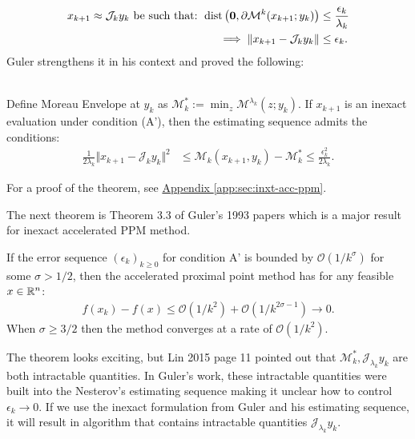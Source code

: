 \documentclass[12pt]{article}
\begin{document}
    \begin{align*}
        x_{k + 1}\approx \mathcal J_{k} y_k \text{ be such that: }
        \operatorname{dist}\left(
            \mathbf 0, \partial \mathcal M^{k}(x_{k + 1}; y_k)
        \right) &\le \frac{\epsilon_k}{\lambda_k}
        \\
        \implies 
        \Vert x_{k + 1} - \mathcal J_{k}y_k\Vert 
        &\le \epsilon_k. 
    \end{align*}
    Guler strengthens it in his context and proved the following: 
    \begin{theorem}\label{thm:guler-inexact-ppm-bound}
        \;\\
        Define Moreau Envelope at $y_k$ as $\mathcal M_k^* := \min_z \mathcal {M}^{\lambda_k}(z; y_k)$. 
        If $x_{k +1}$ is an inexact evaluation under condition (A'), then the estimating sequence admits the conditions: 
        \begin{align*}
            \frac{1}{2\lambda_k} \Vert x_{k + 1} - \mathcal J_k y_k\Vert^2
            &\le 
            \mathcal M_k(x_{k + 1}, y_k) - \mathcal M^*_k
            \le \frac{\epsilon_k^2}{2\lambda_k}. 
        \end{align*}
    \end{theorem}
    \begin{remark}
        For a proof of the theorem, see 
        \hyperref[app:sec:inxt-acc-ppm]{Appendix \ref*{app:sec:inxt-acc-ppm}}. 
    \end{remark}
    The next theorem is Theorem 3.3 of Guler's 1993 papers which is a major result for inexact accelerated PPM method. 
    \begin{theorem}
        If the error sequence $(\epsilon_k)_{k \ge0}$ for condition A' is bounded by $\mathcal O(1/k^\sigma)$ for some $\sigma > 1/2$, then the accelerated proximal point method has for any feasible $x \in \mathbb R^n$: 
        \begin{align*}
            f(x_k) - f(x) \le \mathcal O(1/k^2) + \mathcal O (1 / k^{2\sigma - 1})\rightarrow 0. 
        \end{align*}    
        When $\sigma \ge 3/2$ then the method converges at a rate of $\mathcal O(1/k^2)$. 
    \end{theorem}
    The theorem looks exciting, but Lin 2015 \cite{lin_universal_2015} page 11 pointed out that $\mathcal M_k^*, \mathcal J_{\lambda_k} y_k$ are both intractable quantities. 
    In Guler's work, these intractable quantities were built into the Nesterov's estimating sequence making it unclear how to control $\epsilon_k \rightarrow 0$. 
    If we use the inexact formulation from Guler and his estimating sequence, it will result in algorithm that contains intractable quantities $\mathcal J_{\lambda_k} y_k$. 
\end{document}
